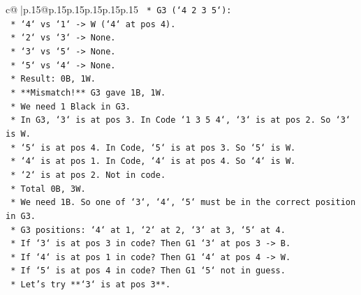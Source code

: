\documentclass{article}
\begin{document}
{\begin{supertabular}{c@{$\;$}|p{.15\linewidth}@{}p{.15\linewidth}p{.15\linewidth}p{.15\linewidth}p{.15\linewidth}p{.15\linewidth}}
{{{\texttt{                                        *   G3 (`4 2 3 5`):} \\
\texttt{                                            *   `4` vs `1` {-}> W (`4` at pos 4).} \\
\texttt{                                            *   `2` vs `3` {-}> None.} \\
\texttt{                                            *   `3` vs `5` {-}> None.} \\
\texttt{                                            *   `5` vs `4` {-}> None.} \\
\texttt{                                            *   Result: 0B, 1W.} \\
\texttt{                                            *   **Mismatch!** G3 gave 1B, 1W.} \\
\texttt{                                            *   We need 1 Black in G3.} \\
\texttt{                                            *   In G3, `3` is at pos 3. In Code `1 3 5 4`, `3` is at pos 2. So `3` is W.} \\
\texttt{                                            *   `5` is at pos 4. In Code, `5` is at pos 3. So `5` is W.} \\
\texttt{                                            *   `4` is at pos 1. In Code, `4` is at pos 4. So `4` is W.} \\
\texttt{                                            *   `2` is at pos 2. Not in code.} \\
\texttt{                                            *   Total 0B, 3W.} \\
\texttt{                                            *   We need 1B. So one of `3`, `4`, `5` must be in the correct position in G3.} \\
\texttt{                                            *   G3 positions: `4` at 1, `2` at 2, `3` at 3, `5` at 4.} \\
\texttt{                                            *   If `3` is at pos 3 in code? Then G1 `3` at pos 3 {-}> B.} \\
\texttt{                                            *   If `4` is at pos 1 in code? Then G1 `4` at pos 4 {-}> W.} \\
\texttt{                                            *   If `5` is at pos 4 in code? Then G1 `5` not in guess.} \\
\texttt{                                            *   Let's try **`3` is at pos 3**.} \\
}}}
\end{supertabular}}
\end{document}
